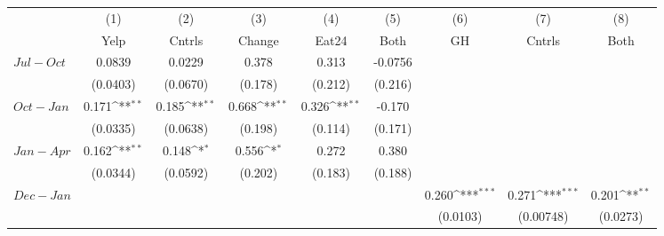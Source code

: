 {
\def\sym#1{\ifmmode^{#1}\else\(^{#1}\)\fi}
\begin{tabular}{l*{8}{c}}
\hline\hline
                    &\multicolumn{1}{c}{(1)}         &\multicolumn{1}{c}{(2)}         &\multicolumn{1}{c}{(3)}         &\multicolumn{1}{c}{(4)}         &\multicolumn{1}{c}{(5)}         &\multicolumn{1}{c}{(6)}         &\multicolumn{1}{c}{(7)}         &\multicolumn{1}{c}{(8)}         \\
                    &        Yelp         &      Cntrls         &      Change         &       Eat24         &        Both         &          GH         &      Cntrls         &        Both         \\
\hline
 $ Jul-Oct $        &      0.0839         &      0.0229         &       0.378         &       0.313         &     -0.0756         &                     &                     &                     \\
                    &    (0.0403)         &    (0.0670)         &     (0.178)         &     (0.212)         &     (0.216)         &                     &                     &                     \\
[1em]
 $ Oct-Jan $        &       0.171\sym{**} &       0.185\sym{**} &       0.668\sym{**} &       0.326\sym{**} &      -0.170         &                     &                     &                     \\
                    &    (0.0335)         &    (0.0638)         &     (0.198)         &     (0.114)         &     (0.171)         &                     &                     &                     \\
[1em]
 $ Jan-Apr $        &       0.162\sym{**} &       0.148\sym{*}  &       0.556\sym{*}  &       0.272         &       0.380         &                     &                     &                     \\
                    &    (0.0344)         &    (0.0592)         &     (0.202)         &     (0.183)         &     (0.188)         &                     &                     &                     \\
[1em]
 $ Dec-Jan $        &                     &                     &                     &                     &                     &       0.260\sym{***}&       0.271\sym{***}&       0.201\sym{**} \\
                    &                     &                     &                     &                     &                     &    (0.0103)         &   (0.00748)         &    (0.0273)         \\

\end{tabular}}
